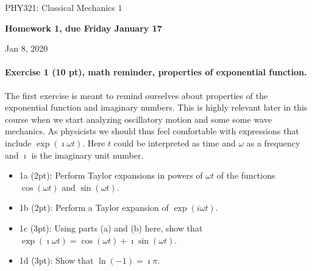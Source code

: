 \documentclass[%
oneside,                 %
final,                   %
10pt]{article}
\begin{document}

\newcommand{\exercisesection}[1]{\subsection*{#1}}






\thispagestyle{empty}

\begin{center}
{\LARGE\bf
\begin{spacing}{1.25}
PHY321: Classical Mechanics 1
\end{spacing}
}
\end{center}


\begin{center}
{\bf Homework 1, due Friday January 17${}^{}$} \\ [0mm]
\end{center}

\begin{center}
\end{center}
    

\begin{center}
Jan 8, 2020
\end{center}

\vspace{1cm}


\paragraph{Exercise 1 (10 pt), math reminder, properties of exponential function.}
The first exercise is meant to remind ourselves about properties of
the exponential function and imaginary numbers. This is highly
relevant later in this course when we start analyzing oscillatory
motion and some some wave mechanics. As physicists we should thus feel comfortable with expressions that
include $\exp{(\imath\omega t)}$. Here $t$ could be interpreted as time and $\omega$ as a frequency and $\imath$ is the imaginary unit number.

\begin{itemize}
\item 1a (2pt): Perform Taylor expansions in powers of $\omega t$ of the functions $\cos{(\omega t)}$ and $\sin{(\omega t)}$.

\item 1b (2pt): Perform a Taylor expansion of $\exp{(i\omega t)}$.

\item 1c (3pt): Using parts (a) and (b) here, show that $\exp{(\imath\omega t)}=\cos{(\omega t)}+\imath\sin{(\omega t)}$.

\item 1d (3pt): Show that $\ln{(−1)} = \imath\pi$.
\end{itemize}
\end{document}
